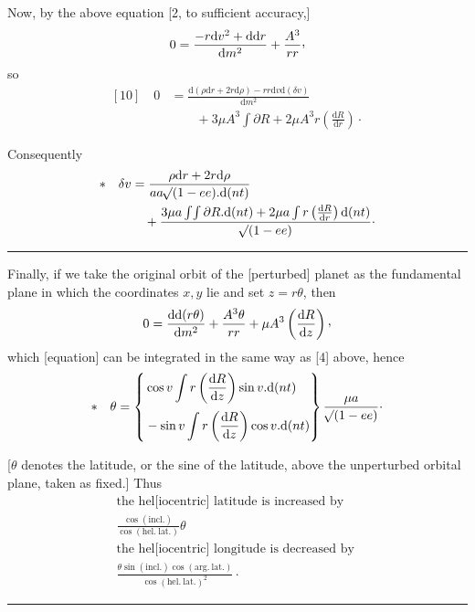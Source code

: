 \par
\noindent\hspace*{\parindent}Now, by the above equation [2, to sufficient accuracy,]
\[
0=\frac{-r\mathrm{d}v^{2}+\mathrm{d}\mathrm{d}r}{\mathrm{d}m^{2}}+\frac{A^{3}}{rr}\mathpunct{\text{\raisebox{.45ex}{,}}}
\]
so
\[
\begin{aligned}
[10]\quad 0&=\frac{\mathrm{d}(\rho\mathrm{d}r+2r\mathrm{d}\rho)-rr\mathrm{d}v\mathrm{d}(\delta v)}{\mathrm{d}m^{2}}\\
&\qquad+3\mu A^{3}\int\partial R+2\mu A^{3}r\left(\frac{\mathrm{d}R}{\mathrm{d}r}\right)\mathpunct{\cdot}
\end{aligned}
\]
\par
\noindent\hspace*{\parindent}Consequently
\[
\begin{aligned}
*\quad\delta v&=\frac{\rho\mathrm{d}r+2r\mathrm{d}\rho}{aa\mathord{{}^{}\!\surd}(1-ee)\mathord{.}\mathrm{d}(nt)}\\
&\quad+\frac{3\mu a\int\!\int\partial R\mathord{.}\mathrm{d}(nt)+2\mu a\int r\left(\frac{\mathrm{d}R}{\mathrm{d}r}\right)\mathrm{d}(nt)}{\mathord{{}^{}\!\surd}(1-ee)}\mathpunct{\cdot}
\end{aligned}
\]
\par\medskip
\begin{center}\rule{.27\linewidth}{.4pt}\end{center}
\par
\noindent\hspace*{\parindent}Finally, if we take the original orbit of the [perturbed] planet as the fundamental plane in which the coordinates \(x,y\) lie and set \(z=r\theta\), then
\[
0=\frac{\mathrm{d}\mathrm{d}(r\theta)}{\mathrm{d}m^{2}}+\frac{A^{3}\theta}{rr}+\mu A^{3}\left(\frac{\mathrm{d}R}{\mathrm{d}z}\right)\mathpunct{\text{\raisebox{.45ex}{,}}}
\]
which [equation] can be integrated in the same way as [4] above, hence
\[
*\quad\theta=\left\{\begin{aligned}&\cos v\int r\left(\frac{\mathrm{d}R}{\mathrm{d}z}\right)\sin v\mathord{.}\mathrm{d}(nt)\\[2pt]&-\sin v\int r\left(\frac{\mathrm{d}R}{\mathrm{d}z}\right)\cos v\mathord{.}\mathrm{d}(nt)\end{aligned}\right\}\frac{\mu a}{\mathord{{}^{}\!\surd}(1-ee)}\mathpunct{\cdot}
\]
\par
\noindent\hspace*{\parindent}[\(\theta\) denotes the latitude, or the sine of the latitude, above the unperturbed orbital plane, taken as fixed.] Thus
\[
\begin{gathered}
\text{the hel[iocentric] latitude is increased by }\\[2pt]
\frac{\cos(\mathrm{incl.})}{\cos(\mathrm{hel.\ lat.})}\theta\\[6pt]
\text{the hel[iocentric] longitude is decreased by }\\[2pt]
\frac{\theta\sin(\mathrm{incl.})\cos(\mathrm{arg.\ lat.})}{\cos(\mathrm{hel.\ lat.})^{2}}\mathpunct{\cdot}
\end{gathered}
\]
\par\medskip
\begin{center}\rule{.27\linewidth}{.4pt}\end{center}
